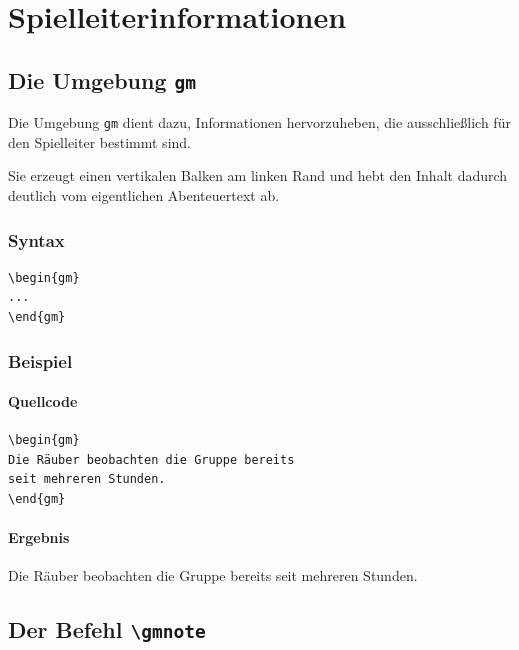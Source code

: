 \section{Spielleiterinformationen}

\subsection{Die Umgebung \texttt{gm}}

Die Umgebung \verb|gm| dient dazu, Informationen hervorzuheben, die ausschließlich für den Spielleiter bestimmt sind.

Sie erzeugt einen vertikalen Balken am linken Rand und hebt den Inhalt dadurch deutlich vom eigentlichen Abenteuertext ab.

\subsubsection*{Syntax}

\begin{Verbatim}
\begin{gm}
...
\end{gm}
\end{Verbatim}

\subsubsection*{Beispiel}

\paragraph{Quellcode}

\begin{Verbatim}
\begin{gm}
Die Räuber beobachten die Gruppe bereits
seit mehreren Stunden.
\end{gm}
\end{Verbatim}

\paragraph{Ergebnis}

\begin{gm}
Die Räuber beobachten die Gruppe bereits
seit mehreren Stunden.
\end{gm}

\newpage

\subsection{Der Befehl \texttt{\textbackslash gmnote}}

